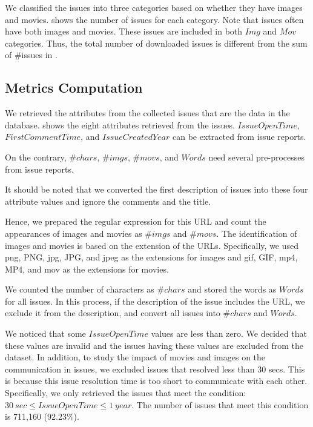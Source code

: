 We classified the issues into three categories based on 
whether they have images and movies. 
 shows the number of issues for each category. 
Note that issues often have both images and movies. 
These issues are included in both $Img$ and $Mov$ categories. 
Thus, the total number of downloaded issues is different from 
the sum of \#issues in . 



% 

\subsection{Metrics Computation}

We retrieved the attributes from the collected issues 
that are the data in the database.  shows the eight attributes 
retrieved from the issues. 
$IssueOpenTime$, $FirstCommentTime$,
and $IssueCreatedYear$ can be extracted from issue reports. 

On the contrary, $\#chars$, $\#imgs$, $\#movs$, and $Words$ need several pre-processes from issue reports. 

It should be noted that we converted the first description of 
issues into these four attribute values and 
ignore the comments and the title.

Hence, we prepared the regular expression for this URL and 
count the appearances of images and movies as $\#imgs$ and $\#movs$. 
The identification of images and movies is based on the extension of 
the URLs. 
Specifically, we used png, PNG, jpg, JPG, and jpeg as 
the extensions for images and 
gif, GIF, mp4, MP4, and mov as the extensions for movies.

We counted the number of characters as $\#chars$ and 
stored the words as $Words$ for all issues. 
In this process, if the description of the issue 
includes the URL, we exclude it from the description, 
and convert all issues into $\#chars$ and $Words$.

We noticed that some $IssueOpenTime$ values are less than zero. 
We decided that these values are invalid and the issues having 
these values are excluded from the dataset. 
In addition, to study the impact of movies and images on 
the communication in issues, 
we excluded issues that resolved less than 30 secs. 
This is because this issue resolution time is too short 
to communicate with each other. 
Specifically, we only retrieved the issues that meet 
the condition: $30\ sec \leq IssueOpenTime \leq 1\ year$.
The number of issues that meet this condition is 711,160 (92.23\%).